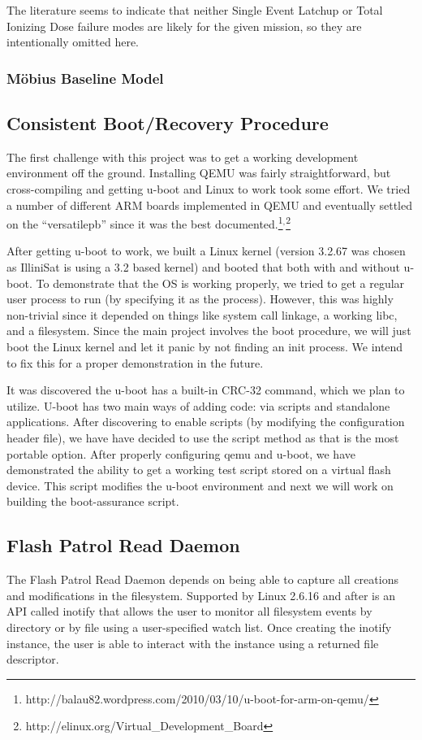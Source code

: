 The literature seems to indicate that neither Single Event Latchup or Total Ionizing Dose \cite{Likar2010Novel, Oldham2008TID} failure modes are likely for the given mission, so they are intentionally omitted here.

\subsubsection{M\"obius Baseline Model}

\subsection{Consistent Boot/Recovery Procedure}
The first challenge with this project was to get a working development
environment off the ground.  Installing QEMU was fairly straightforward, but
cross-compiling and getting u-boot and Linux to work took some effort.  We tried
a number of different ARM boards implemented in QEMU and eventually settled on
the ``versatilepb'' since it was the best documented.\footnote{http://balau82.wordpress.com/2010/03/10/u-boot-for-arm-on-qemu/}$^{,}$\footnote{http://elinux.org/Virtual\_Development\_Board}

After getting u-boot to work, we built a Linux kernel (version 3.2.67 was chosen
as IlliniSat is using a 3.2 based kernel) and booted that both with and without 
u-boot.  To demonstrate that the OS is working properly, we tried to get a
regular user process to run (by specifying it as the  process).
However, this was highly non-trivial since it depended on things like system
call linkage, a working libc, and a filesystem.  Since the main project involves
the boot procedure, we will just boot the Linux kernel and let it panic by not
finding an init process. We intend to fix this for a proper demonstration in the
future.

It was discovered the u-boot has a built-in CRC-32 command, which we plan to
utilize. U-boot has two main ways of adding code: via scripts and standalone
applications.  After discovering to enable scripts (by modifying the
configuration header file), we have have decided to use the script method as
that is the most portable option. After properly configuring qemu and u-boot, we
have demonstrated the ability to get a working test script stored on a virtual
flash device.  This script modifies the u-boot environment and next we will work
on building the boot-assurance script.  


\subsection{Flash Patrol Read Daemon}
The Flash Patrol Read Daemon depends on being able to capture all creations 
and modifications in the filesystem. Supported by Linux 2.6.16 and after is an API
called inotify that allows the user to monitor all filesystem events by directory or by 
file using a user-specified watch list. Once creating the inotify instance, the user is able to 
interact with the instance using a returned file descriptor. 

